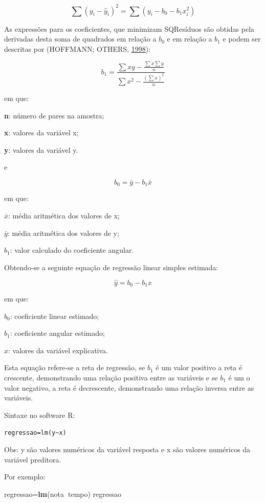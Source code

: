 \documentclass[12pt,brazil,oneside]{book}
\newenvironment{Shaded}{\begin{snugshade}}{\end{snugshade}}
\newcommand{\KeywordTok}[1]{\textcolor[rgb]{0.13,0.29,0.53}{\textbf{#1}}}
\newcommand{\NormalTok}[1]{#1}
\newcommand{\OperatorTok}[1]{\textcolor[rgb]{0.81,0.36,0.00}{\textbf{#1}}}
\begin{document}
\[
\sum (y_i-\hat y_i)^2=\sum (y_i-b_0-b_1x_i^2)
\]

As expressões para os coeficientes, que minimizam SQResíduos são obtidas
pela derivadas desta soma de quadrados em relação a \(b_0\) e em relação
a \(b_1\) e podem ser descritas por (HOFFMANN; OTHERS,
\protect\hyperlink{ref-hoffmann1998}{1998}):

\[
b_1=\frac{\sum xy-\frac{\sum x \sum y}{n}}{\sum x^2 - \frac{(\sum x)^2}{n}}
\]

em que:

\textbf{n}: número de pares na amostra;

\textbf{x}: valores da variável x;

\textbf{y}: valores da variável y.

e

\[
b_0=\bar{y}-b_1\bar{x}
\]

em que:

\(\bar{x}\): média aritmética dos valores de x;

\(\bar{y}\): média aritmética dos valores de y;

\(b_1\): valor calculado do coeficiente angular.

Obtendo-se a seguinte equação de regressão linear simples estimada:

\[
\hat{y}=b_0-b_1{x}
\]

em que:

\(b_0\): coeficiente linear estimado;

\(b_1\): coeficiente angular estimado;

\(x\): valores da variável explicativa.

Esta equação refere-se a reta de regressão, se \(b_1\) é um valor
positivo a reta é crescente, demonstrando uma relação positiva entre as
variáveis e se \(b_1\) é um o valor negativo, a reta é decrescente,
demonstrando uma relação inversa entre as variáveis.

Sintaxe no software R:

\texttt{regressao=lm(y\textasciitilde{}x)}

Obs: y são valores numéricos da variável resposta e x são valores
numéricos da variável preditora.

Por exemplo:

\begin{Shaded}
\begin{Highlighting}[]
\NormalTok{regressao=}\KeywordTok{lm}\NormalTok{(nota}\OperatorTok{~}\NormalTok{tempo)}
\NormalTok{regressao}
\end{Highlighting}
\end{Shaded}
\end{document}
